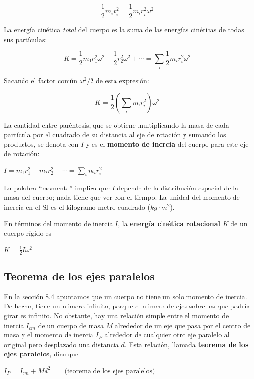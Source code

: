 \documentclass{article}
\newcommand{\newsubsection}[1]{
    \vspace{0.5cm}
    \color{sectionColor}
    \subsection{\bl{#1}}
    \color{black}
    \vspace{0.5cm}
}
\newcommand{\bl}[1]{\textbf{#1}}
\newcommand{\definicion}[1]{%
    \vspace{0.5cm}
    \begin{definicionbox}
        #1
    \end{definicionbox}
    \vspace{0.5cm}
}
\begin{document}
    \[ \frac{1}{2} m_i v_i^2 = \frac{1}{2} m_i r_i^2 \omega^2 \]

    \par La energía cinética \textit{total} del cuerpo es la suma de las energías cinéticas de todas sus partículas:

    \[ K = \frac{1}{2} m_1 r_1^2 \omega^2 + \frac{1}{2} r_2^2 \omega^2 + \cdots = \sum_{i}^{} \frac{1}{2} m_i r_i^2 \omega^2 \]

    \par Sacando el factor común $\omega^2/2$ de esta expresión:
    
    \[ K = \frac{1}{2} \left(\sum_{i}^{} m_i r_i^2\right)  \omega^2 \]

    \par La cantidad entre paréntesis, que se obtiene multiplicando la masa de cada partícula por el cuadrado de su distancia al eje de rotación y sumando los productos, se denota con $I$ y es el \bl{momento de inercia} del cuerpo para este eje de rotación:

    \definicion{
        \centering
        \( I = m_1 r_1^2 + m_2 r_2^2 + \cdots = \sum_{i}^{} m_i r_i^2 \)
    }

    \par La palabra “momento” implica que $I$ depende de la distribución espacial de la masa del cuerpo; nada tiene que ver con el tiempo. La unidad del momento de inercia en el SI es el kilogramo-metro cuadrado ($kg \cdot m^2$).

    \par En términos del momento de inercia $I$, la \bl{energía cinética rotacional} $K$ de un cuerpo rígido es

    \definicion{
        \centering
        \( K = \frac{1}{2} I \omega^2 \)
    }

    \newsubsection{Teorema de los ejes paralelos}

    \par En la sección 8.4 apuntamos que un cuerpo no tiene un solo momento de inercia. De hecho, tiene un número infinito, porque el número de ejes sobre los que podría girar es infinito. No obstante, hay una relación simple entre el momento de inercia $I_{cm}$ de un cuerpo de masa $M$ alrededor de un eje que pasa por el centro de masa y el momento de inercia $I_P$ alrededor de cualquier otro eje paralelo al original pero desplazado una distancia $d$. Esta relación, llamada \bl{teorema de los ejes paralelos}, dice que

    \definicion{
        \centering
        \( I_P = I_{cm} + M d^2 \quad \quad \text{(teorema de los ejes paralelos)} \)
    }
\end{document}

